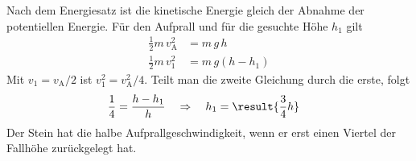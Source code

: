 Nach dem Energiesatz ist die kinetische Energie gleich der Abnahme der potentiellen Energie. Für den Aufprall und für die gesuchte Höhe $h_1$ gilt
\begin{align}
 \frac{1}{2}m\,v_\mathrm{A}^2 &= m\,g\,h \\
 \frac{1}{2}m\,v_1^2 &= m\,g\left(h-h_1\right)
\end{align}
Mit $v_1 = v_\mathrm{A}/2$ ist $v_1^2 = v_\mathrm{A}^2/4$. Teilt man die zweite Gleichung durch die erste, folgt
\begin{align}
 \frac{1}{4} &= \frac{h-h_1}{h} \quad\Rightarrow\quad h_1 = \result{\frac{3}{4}h}
\end{align}
Der Stein hat die halbe Aufprallgeschwindigkeit, wenn er erst einen Viertel der Fallhöhe zurückgelegt hat.

